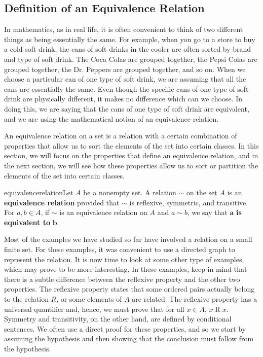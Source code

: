 \subsection*{Definition of an Equivalence Relation}
In mathematics, as in real life, it is often convenient to think of two different things as being essentially the same.  For example, when you go to a store to buy a cold soft drink, the cans of soft drinks in the cooler are often sorted by brand and type of soft drink.  The Coca Colas are grouped together, the Pepsi Colas are grouped together, the Dr. Peppers are grouped together, and so on.  When we choose a particular can of one type of soft drink, we are assuming that all the cans are essentially the same.  Even though the specific cans of one type of soft drink are physically different, it makes no difference which can we choose.  In doing this, we are saying that the cans of one type of soft drink are equivalent, and we are using the mathematical notion of an equivalence relation.

An equivalence relation on a set is a relation with a certain combination of properties that allow us to sort the elements of the set into certain classes.  In this section, we will focus on the properties that define an equivalence relation, and in the next section, we will see how these properties allow us to sort or partition the elements of the set into certain classes.

\begin{defbox}{equivalencerelation}{Let  $A$  be a nonempty set.  A relation  $\sim$  on the set  $A$  is an \textbf{equivalence relation}
%
%
 provided that  $\sim$  is reflexive, symmetric, and transitive.  For  $a, b \in A$, if  $\sim$  is an equivalence relation on  $A$  and  $a \sim b$, we say that  $\boldsymbol{a}$  \textbf{is equivalent to}  $\boldsymbol{b}$.}
\end{defbox}
Most of the examples we have studied so far have involved a relation on a small finite set.  For these examples, it was convenient to use a directed graph to represent the relation.  It is now time to look at some other type of examples, which may prove to be more interesting.  In these examples, keep in mind that there is a subtle difference between the reflexive property and the other two properties.  The reflexive property states that some ordered pairs actually belong to the relation  $R$, or some elements of  $A$  are related.  The reflexive property has a universal quantifier and, hence, we must prove that for all  $x \in A$,  $x \mathrel{R} x$.  Symmetry and transitivity, on the other hand, are defined by conditional sentences.  We often use a direct proof for these properties, and so we start by assuming the hypothesis and then showing that the conclusion must follow from the hypothesis.

